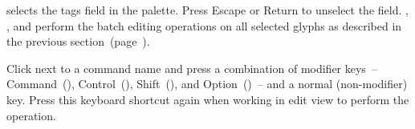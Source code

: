 \bigbreak\noindent%

\bigbreak\noindent{} selects the tags field in the palette.
Press Escape or Return to unselect the field.
, , and  perform the batch editing operations on all selected glyphs as described in the previous section~(page~\pageref{sec:batch_editing_tags}).

Click  next to a command name and press a combination of modifier keys~-- Command~(), Control~(), Shift~(), and Option~()~-- and a normal (non-modifier) key.
Press this keyboard shortcut again when working in edit view to perform the operation.
